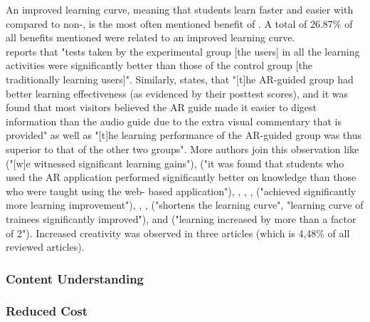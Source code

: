 An improved learning curve, meaning that students learn faster and easier with \AR \apps compared to non-\AR \appsns, is the most often mentioned benefit of \ARns. A total of 26.87\% of all benefits mentioned were related to an improved learning curve. \\
\cite{Liu.2009} reports that "tests taken by the experimental group [the \AR \app users] in all the learning activities were significantly better than those of the control group [the traditionally learning users]".\autocite[525]{Liu.2009} Similarly, \cite{Chang.2014} states, that "[t]he AR-guided group had better learning effectiveness (as evidenced by their posttest scores), and it was found that most visitors believed the AR guide made it easier to digest information than the audio guide due to the extra visual commentary that is provided"\autocite[193]{Chang.2014} as well as "[t]he learning performance of the AR-guided group was thus superior to
that of the other two groups"\autocite[190]{Chang.2014}. More authors join this observation like \cite{Kamarainen.2013} ("[w]e witnessed significant learning gains"\autocite[550]{Kamarainen.2013}), \cite{Ibanez.2014} ("it was found that students who used the AR application performed significantly better on knowledge than those who were taught using the web- based application"\autocite[12]{Ibanez.2014}), \cite{Li.2011}, \cite{MartinGutierrez.2011}, \cite{Redondo.2013}, \cite{Liu.2009b} ("achieved significantly more learning improvement"\autocite[173]{Liu.2009b}), \cite{Zhang.2014}, \cite{Yeo.2011}, \cite{Hou.2013} ("shortens the learning curve"\autocite[450]{Hou.2013}, "learning curve of trainees significantly improved"\autocite[451]{Hou.2013}), \cite{Wilson.2013} and \cite{Anderson.2013} ("learning increased by more than a factor of 2"\autocite[318]{Anderson.2013}).
Increased creativity was observed in three articles (which is 4,48\% of all reviewed articles).
% 
\subsubsection{Content Understanding}

% 
\subsubsection{Reduced Cost}